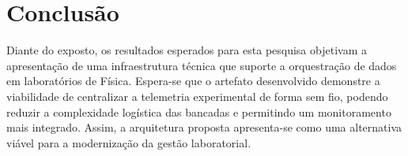 \section{Conclusão}
Diante do exposto, os resultados esperados para esta pesquisa objetivam a apresentação de uma infraestrutura técnica que suporte a orquestração de dados em laboratórios de Física. Espera-se que o artefato desenvolvido demonstre a viabilidade de centralizar a telemetria experimental de forma sem fio, podendo reduzir a complexidade logística das bancadas e permitindo um monitoramento mais integrado. Assim, a arquitetura proposta apresenta-se como uma alternativa viável para a modernização da gestão laboratorial.
